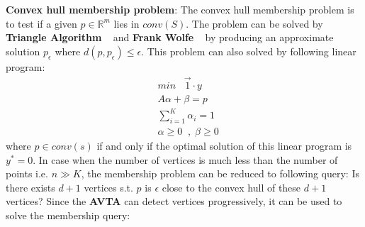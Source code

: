 \documentclass[]{article}
\begin{document}
	\noindent \textbf{Convex hull membership problem}: 
	The convex hull membership problem is to test if a given $p \in \mathbb{R}^m$ lies in $conv(S)$. The problem can be solved by \textbf{Triangle Algorithm} ~\cite{kalantari2015characterization} and \textbf{Frank Wolfe} ~\cite{jaggi2013revisiting} by producing an approximate solution $p_\epsilon$ where $d(p,p_\epsilon)  \leq \epsilon$. This problem can also solved by following linear program:\\
	\begin{equation}
		\begin{aligned}
		&min \;\;\; \vec{1} \cdot y\\
		&  A\alpha+\beta=p\\ 
		&  \sum_{i=1}^{K} \alpha_i=1\\
		& \alpha\geq0\;\;,\;\beta\geq0
		\end{aligned}
	\end{equation}
	where $p \in conv(s)$ if and only if the optimal solution of this linear program is $y^*=0$. In case when the number of vertices is much less than the number of points i.e. $n \gg K$, the membership problem can be reduced to following query: Is there exists $d+1$ vertices s.t. $p$ is $\epsilon$ close to the convex hull of these $d+1$ vertices? Since the \textbf{AVTA} can detect vertices progressively, it can be used to solve the membership query:
\end{document}
